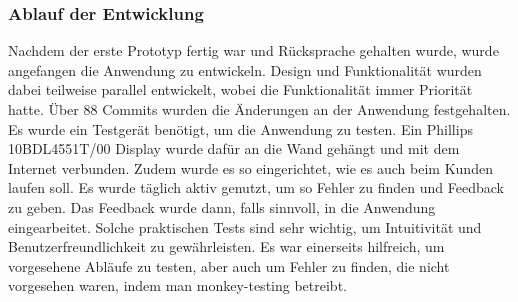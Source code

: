 \subsubsection{Ablauf der Entwicklung}
Nachdem der erste Prototyp fertig war und Rücksprache gehalten wurde, wurde angefangen die Anwendung zu entwickeln.
Design und Funktionalität wurden dabei teilweise parallel entwickelt, wobei die Funktionalität immer Priorität hatte.
Über 88 Commits wurden die Änderungen an der Anwendung festgehalten.
\newline
Es wurde ein Testgerät benötigt, um die Anwendung zu testen.
Ein Phillips 10BDL4551T/00 Display wurde dafür an die Wand gehängt und mit dem Internet verbunden.
Zudem wurde es so eingerichtet, wie es auch beim Kunden laufen soll.
\newline
Es wurde täglich aktiv genutzt, um so Fehler zu finden und Feedback zu geben.
Das Feedback wurde dann, falls sinnvoll, in die Anwendung eingearbeitet.
Solche praktischen Tests sind sehr wichtig, um Intuitivität und Benutzerfreundlichkeit zu gewährleisten.
Es war einerseits hilfreich, um vorgesehene Abläufe zu testen, aber auch um Fehler zu finden, die nicht vorgesehen waren, indem man monkey-testing betreibt.
\newline
